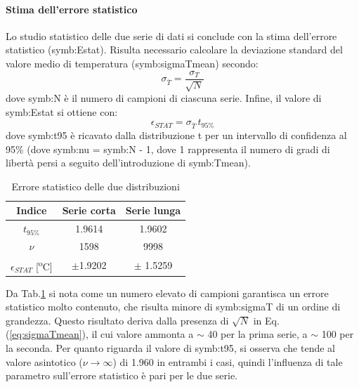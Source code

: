 \paragraph{Stima dell'errore statistico}
Lo studio statistico delle due serie di dati si conclude con la stima dell'errore statistico (\gls{symb:Estat}).  Risulta necessario calcolare la deviazione standard del valore medio di temperatura (\gls{symb:sigmaTmean}) secondo:
\begin{equation}
	\sigma_{\overline{T}} = \frac{\sigma_{T}}{\sqrt{N}} \label{eq:sigmaTmean}
\end{equation}
dove \gls{symb:N} è il numero di campioni di ciascuna serie.
Infine, il valore di \gls{symb:Estat} si ottiene con:
\begin{equation}
	\epsilon_{\textit{STAT}}=\sigma_{\overline{T}}\,t_{\textit{95\%}}
\end{equation}
dove \gls{symb:t95} è ricavato dalla distribuzione t per un intervallo di confidenza al 95\% (dove \gls{symb:nu} = \gls{symb:N} - 1, dove 1 rappresenta il numero di gradi di libertà persi a seguito dell'introduzione di \gls{symb:Tmean}).
\begin{table} [H]
	\centering
	\begin{tabular}{c|c|c}
		\toprule
		\toprule
		\textbf{Indice} & \textbf{Serie corta}&\textbf{Serie lunga}\\
		\midrule
		\midrule
		$t_{\textit{95\%}}$ &1.9614&1.9602\\
		\midrule
		$\nu$ & 1598 & 9998\\
		\midrule
		$\epsilon_{\textit{STAT}}$  [\textsuperscript{o}C]& $\pm $1.9202 &  $ \pm$ 1.5259\\
		\bottomrule
		\bottomrule
	\end{tabular}
	\caption{Errore statistico delle due distribuzioni}
	\label{tab:errorestat}
\end{table}

Da Tab.\ref{tab:errorestat} si nota come un numero elevato di campioni garantisca un errore statistico molto contenuto, che risulta minore di \gls{symb:sigmaT} di un ordine di grandezza. Questo risultato deriva dalla presenza di $\sqrt{N}$ in Eq.(\ref{eq:sigmaTmean}), il cui valore ammonta a $\sim$ 40 per la prima serie, a $\sim$ 100 per la seconda. Per quanto riguarda il valore di \gls{symb:t95}, si osserva che tende al valore asintotico ($\nu \rightarrow \infty $) di 1.960 in entrambi i casi, quindi l'influenza di tale parametro sull'errore statistico è pari per le due serie.

